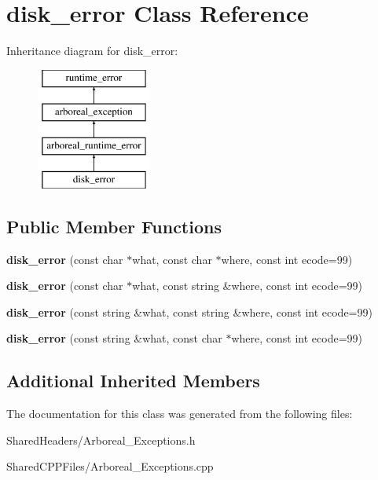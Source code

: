 \hypertarget{classdisk__error}{}\section{disk\+\_\+error Class Reference}
\label{classdisk__error}
Inheritance diagram for disk\+\_\+error\+:\begin{figure}[H]
\begin{center}
\leavevmode
\includegraphics[height=4.000000cm]{classdisk__error}
\end{center}
\end{figure}
\subsection*{Public Member Functions}
\begin{DoxyCompactItemize}
\item 
{\bfseries disk\+\_\+error} (const char $\ast$what, const char $\ast$where, const int ecode=99)\hypertarget{classdisk__error_a2b3f22e37f13642df676c5eaf10526d3}{}\label{classdisk__error_a2b3f22e37f13642df676c5eaf10526d3}

\item 
{\bfseries disk\+\_\+error} (const char $\ast$what, const string \&where, const int ecode=99)\hypertarget{classdisk__error_a0c883fc590a36b64bfb88b403637a89f}{}\label{classdisk__error_a0c883fc590a36b64bfb88b403637a89f}

\item 
{\bfseries disk\+\_\+error} (const string \&what, const string \&where, const int ecode=99)\hypertarget{classdisk__error_af7db4123b6989178ad42e577a94b053e}{}\label{classdisk__error_af7db4123b6989178ad42e577a94b053e}

\item 
{\bfseries disk\+\_\+error} (const string \&what, const char $\ast$where, const int ecode=99)\hypertarget{classdisk__error_a0288a245365c28dc6c48e5fd0c8fafd7}{}\label{classdisk__error_a0288a245365c28dc6c48e5fd0c8fafd7}

\end{DoxyCompactItemize}
\subsection*{Additional Inherited Members}


The documentation for this class was generated from the following files\+:\begin{DoxyCompactItemize}
\item 
Shared\+Headers/Arboreal\+\_\+\+Exceptions.\+h\item 
Shared\+C\+P\+P\+Files/Arboreal\+\_\+\+Exceptions.\+cpp\end{DoxyCompactItemize}
